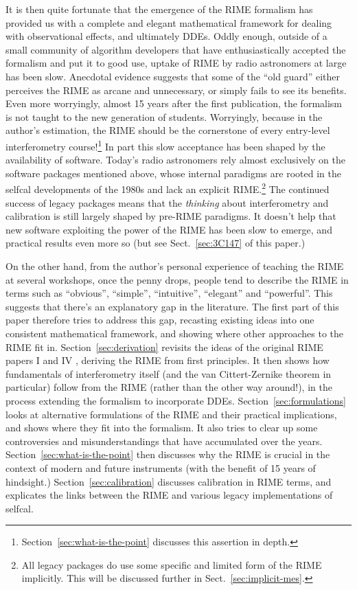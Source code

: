 \documentclass[]{aa}
\begin{document}
It is then quite fortunate that the emergence of the RIME formalism has provided us with a complete and elegant mathematical framework for dealing with observational effects, and ultimately DDEs. Oddly enough, outside of a small community of algorithm developers that have enthusiastically accepted the formalism and put it to good use, uptake of RIME by radio astronomers at large has been slow. Anecdotal evidence suggests that some of the ``old guard'' either perceives the RIME as arcane and unnecessary, or simply fails to see its benefits. Even more worryingly, almost 15 years after the first publication, the formalism is not taught to the new generation of students. Worryingly, because in the author's estimation, the RIME should be the cornerstone of every entry-level interferometry course!\footnote{Section~\ref{sec:what-is-the-point} discusses this assertion in depth.} In part this slow acceptance has been shaped by the availability of software. Today's radio astronomers rely almost exclusively on the software packages mentioned above, whose internal paradigms are rooted in the selfcal developments of the 1980s and lack an explicit RIME.\footnote{All legacy packages do use some specific and limited form of the RIME implicitly. This will be discussed further in Sect.~\ref{sec:implicit-mes}.} The continued success of legacy packages means that the {\em thinking} about interferometry and calibration is still largely shaped by pre-RIME paradigms. It doesn't help that new software exploiting the power of the RIME has been slow to emerge, and practical results even more so (but see Sect.~\ref{sec:3C147} of this paper.)  

On the other hand, from the author's personal experience of teaching the RIME at several workshops, once the penny drops, people tend to describe the RIME in terms such as ``obvious'', ``simple'', ``intuitive'', ``elegant'' and ``powerful''. This suggests that there's an explanatory gap in the literature. The first part of this paper therefore tries to address this gap, recasting existing ideas into one consistent mathematical framework, and showing where other approaches to the RIME fit in. Section~\ref{sec:derivation} revisits the ideas of the original RIME papers I and IV \citep{ME1, ME4}, deriving the RIME from first principles. It then shows how fundamentals of interferometry itself (and the van Cittert-Zernike theorem in particular) follow from the RIME (rather than the other way around!), in the process extending the formalism to incorporate DDEs. Section~\ref{sec:formulations} looks at alternative formulations of the RIME and their practical implications, and shows where they fit into the formalism. It also tries to clear up some controversies and misunderstandings that have accumulated over the years. Section~\ref{sec:what-is-the-point} then discusses why the RIME is crucial in the context of modern and future instruments (with the benefit of 15 years of hindsight.) Section~\ref{sec:calibration} discusses calibration in RIME terms, and explicates the links between the RIME and various legacy implementations of selfcal. 
\end{document}
